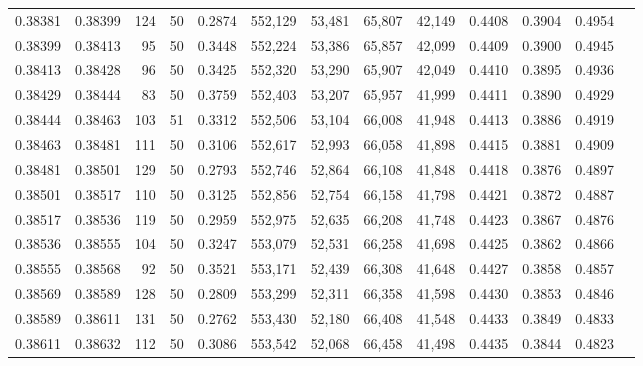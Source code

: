 \begin{tabular}{rrrrrrrrrrrrr}
0.38381 & 0.38399 &   124 &  50 &                                     0.2874 & 552,129 &  53,481 &  65,807 &  42,149 & 0.4408 & 0.3904 & 0.4954 \\
0.38399 & 0.38413 &    95 &  50 &                                     0.3448 & 552,224 &  53,386 &  65,857 &  42,099 & 0.4409 & 0.3900 & 0.4945 \\
0.38413 & 0.38428 &    96 &  50 &                                     0.3425 & 552,320 &  53,290 &  65,907 &  42,049 & 0.4410 & 0.3895 & 0.4936 \\
0.38429 & 0.38444 &    83 &  50 &                                     0.3759 & 552,403 &  53,207 &  65,957 &  41,999 & 0.4411 & 0.3890 & 0.4929 \\
0.38444 & 0.38463 &   103 &  51 &                                     0.3312 & 552,506 &  53,104 &  66,008 &  41,948 & 0.4413 & 0.3886 & 0.4919 \\
0.38463 & 0.38481 &   111 &  50 &                                     0.3106 & 552,617 &  52,993 &  66,058 &  41,898 & 0.4415 & 0.3881 & 0.4909 \\
0.38481 & 0.38501 &   129 &  50 &                                     0.2793 & 552,746 &  52,864 &  66,108 &  41,848 & 0.4418 & 0.3876 & 0.4897 \\
0.38501 & 0.38517 &   110 &  50 &                                     0.3125 & 552,856 &  52,754 &  66,158 &  41,798 & 0.4421 & 0.3872 & 0.4887 \\
0.38517 & 0.38536 &   119 &  50 &                                     0.2959 & 552,975 &  52,635 &  66,208 &  41,748 & 0.4423 & 0.3867 & 0.4876 \\
0.38536 & 0.38555 &   104 &  50 &                                     0.3247 & 553,079 &  52,531 &  66,258 &  41,698 & 0.4425 & 0.3862 & 0.4866 \\
0.38555 & 0.38568 &    92 &  50 &                                     0.3521 & 553,171 &  52,439 &  66,308 &  41,648 & 0.4427 & 0.3858 & 0.4857 \\
0.38569 & 0.38589 &   128 &  50 &                                     0.2809 & 553,299 &  52,311 &  66,358 &  41,598 & 0.4430 & 0.3853 & 0.4846 \\
0.38589 & 0.38611 &   131 &  50 &                                     0.2762 & 553,430 &  52,180 &  66,408 &  41,548 & 0.4433 & 0.3849 & 0.4833 \\
0.38611 & 0.38632 &   112 &  50 &                                     0.3086 & 553,542 &  52,068 &  66,458 &  41,498 & 0.4435 & 0.3844 & 0.4823 \\

\end{tabular}
